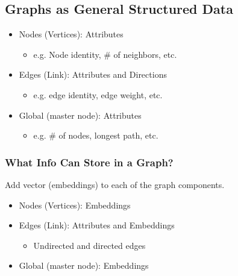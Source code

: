 \subsection{Graphs as General Structured Data}
\begin{definition}
    \begin{itemize}
        \item Nodes (Vertices): Attributes 
        \begin{itemize}
            \item e.g. Node identity, \# of neighbors, etc.
        \end{itemize}
        \item Edges (Link): Attributes and Directions
        \begin{itemize}
            \item e.g. edge identity, edge weight, etc.
        \end{itemize}
        \item Global (master node): Attributes
        \begin{itemize}
            \item e.g. \# of nodes, longest path, etc.
        \end{itemize}
    \end{itemize}
\end{definition}

\subsubsection{What Info Can Store in a Graph?}
\begin{notes} Add vector (embeddings) to each of the graph components.
    \begin{itemize}
        \item Nodes (Vertices): Embeddings
        \item Edges (Link): Attributes and Embeddings
        \begin{itemize}
            \item Undirected and directed edges
        \end{itemize}
        \item Global (master node): Embeddings
    \end{itemize}
\end{notes}
\newpage

